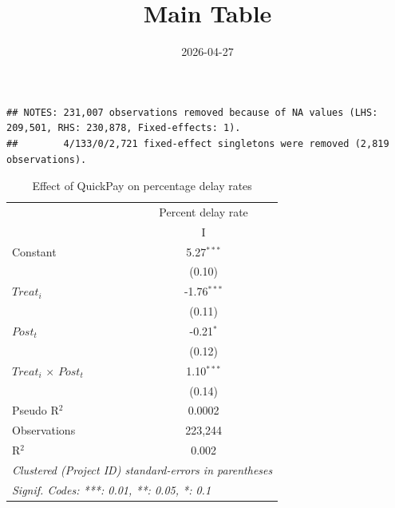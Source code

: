 \documentclass[
]{article}
\title{Main Table}
\author{}
\date{\vspace{-2.5em}2026-04-27}
\begin{document}
\maketitle

\begin{verbatim}
## NOTES: 231,007 observations removed because of NA values (LHS: 209,501, RHS: 230,878, Fixed-effects: 1).
##        4/133/0/2,721 fixed-effect singletons were removed (2,819 observations).
\end{verbatim}

\begin{table}[htbp]
   \caption{Effect of QuickPay on percentage delay rates}
   \centering
   \small
   \begin{tabular}{lc}
      \toprule
                                   & Percent delay rate\\  
                                   & I\\  
      \midrule 
      Constant                     & 5.27$^{***}$\\   
                                   & (0.10)\\   
      $Treat_i$                    & -1.76$^{***}$\\   
                                   & (0.11)\\   
      $Post_t$                     & -0.21$^{*}$\\   
                                   & (0.12)\\   
      $Treat_i$ $\times$ $Post_t$  & 1.10$^{***}$\\   
                                   & (0.14)\\   
      Pseudo R$^2$                 & 0.0002\\  
      Observations                 & 223,244\\  
      R$^2$                        & 0.002\\  
      \midrule
      \multicolumn{2}{l}{\emph{Clustered (Project ID) standard-errors in parentheses}}\\
      \multicolumn{2}{l}{\emph{Signif. Codes: ***: 0.01, **: 0.05, *: 0.1}}\\
   \end{tabular}
\end{table}
\end{document}
